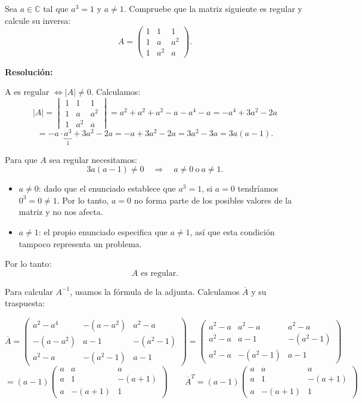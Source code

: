 \documentclass[a4paper,12pt]{article}
\begin{document}
\begin{ejercicio}[title=Ejercicio 17]
Sea $a \in \mathbb{C}$ tal que $a^3 = 1$ y $a \ne 1$.  
Compruebe que la matriz siguiente es regular y calcule su inversa:
\[
A =
\begin{pmatrix}
1 & 1 & 1\\
1 & a & a^2\\
1 & a^2 & a
\end{pmatrix}.
\]

\tcblower
\textbf{Resolución:}

A es regular $\Longleftrightarrow |A| \neq 0$.  
Calculamos:
\[
|A| =
\begin{vmatrix}
1 & 1 & 1\\
1 & a & a^2\\
1 & a^2 & a
\end{vmatrix}
=
a^2 + a^2 + a^2 - a - a^4 - a
= -a^4 + 3a^2 - 2a
\]
\[
= -a \cdot \underbrace{a^3}_{1}
+ 3a^2 - 2a
= -a + 3a^2 - 2a
= 3a^2 - 3a
= 3a(a-1).
\]

Para que $A$ sea regular necesitamos:
\[
3a(a-1) \neq 0 \quad\Longrightarrow\quad a\neq 0 \ \text{o}\ a\neq 1.
\]

\begin{itemize}
    \item \(a\neq 0\): dado que el enunciado establece que \(a^3=1\), si \(a=0\) tendríamos \(0^3=0\neq 1\). Por lo tanto, \(a=0\) no forma parte de los posibles valores de la matriz y no nos afecta.
    
    \item \(a\neq 1\): el propio enunciado especifica que \(a\neq 1\), así que esta condición tampoco representa un problema.
\end{itemize}

Por lo tanto:
\[
\boxed{A \text{ es regular}.}
\]

Para calcular $A^{-1}$, usamos la fórmula de la adjunta. Calculamos $\overline{A}$ y su traspuesta:

\[
\overline{A} =
\begin{pmatrix}
    a^2-a^4 & -(a-a^2) & a^2-a \\
    -(a-a^2) & a-1 & -(a^2-1) \\
    a^2-a & -(a^2-1) & a-1
\end{pmatrix}
= \begin{pmatrix}
    a^2-a & a^2-a & a^2-a \\
    a^2-a & a-1 & -(a^2-1) \\
    a^2-a & -(a^2-1) & a-1
\end{pmatrix}
\]
\[
= (a-1) \begin{pmatrix}
    a & a & a \\
    a & 1 & -(a+1) \\
    a & -(a+1) & 1
\end{pmatrix}
\qquad
\overline{A}^T =
(a-1) \begin{pmatrix}
    a & a & a \\
    a & 1 & -(a+1) \\
    a & -(a+1) & 1
    \end{pmatrix}
\]


\end{ejercicio}
\end{document}

